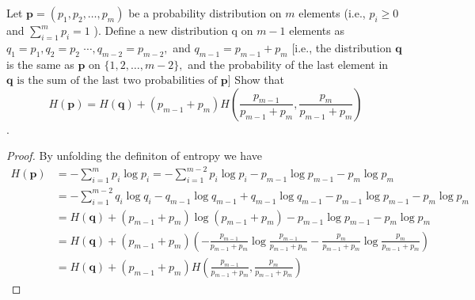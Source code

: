 \begin{exercise}{Let $\mathbf{p}=\left(p_{1}, p_{2}, \ldots, p_{m}\right)$ be a probability distribution on $m$ elements (i.e., $p_{i} \geq 0$ and $\sum_{i=1}^{m} p_{i}=1$ ). Define a new distribution q on $m-1$ elements as $q_{1}=p_{1}, q_{2}=p_{2}$ $\cdots, q_{m-2}=p_{m-2},$ and $q_{m-1}=p_{m-1}+p_{m}$ [i.e., the distribution $\mathbf{q}$ is the same as $\mathbf{p}$ on $\{1,2, \ldots, m-2\},$ and the probability of the last element in $\mathbf{q} \text { is the sum of the last two probabilities of } \mathbf{p}]$ Show that
\begin{equation}H(\mathbf{p})=H(\mathbf{q})+\left(p_{m-1}+p_{m}\right) H\left(\frac{p_{m-1}}{p_{m-1}+p_{m}}, \frac{p_{m}}{p_{m-1}+p_{m}}\right)\end{equation}
  }.
  \begin{proof}
    By unfolding the definiton of entropy we have
    \begin{equation}\begin{aligned}
      H(\mathbf{p}) &=-\sum_{i=1}^{m} p_{i} \log p_{i} =-\sum_{i=1}^{m-2} p_{i}\log p_{i}-p_{m-1} \log p_{m-1}-p_{m} \log p_{m} \\
      &=-\sum_{i=1}^{m-2} q_{i} \log q_{i}-q_{m-1} \log q_{m-1}+ q_{m-1} \log q_{m-1} -p_{m-1} \log p_{m-1}-p_{m} \log p_{m} \\
      &= H(\mathbf{q}) + (p_{m-1}+p_{m}) \log (p_{m-1}+p_{m}) -p_{m-1} \log p_{m-1}-p_{m} \log p_{m} \\
      &= H(\mathbf{q})+\left(p_{m-1}+p_{m}\right)\left(- \frac{p_{m-1}}{p_{m-1}+p_{m}} \log \frac{p_{m-1}}{p_{m-1}+p_{m}} - \frac{p_{m}}{p_{m-1}+p_{m}} \log \frac{p_{m}}{p_{m-1}+p_{m}} \right) \\
      &=H(\mathbf{q})+\left(p_{m-1}+p_{m}\right) H\left(\frac{p_{m-1}}{p_{m-1}+p_{m}}, \frac{p_{m}}{p_{m-1}+p_{m}}\right)
      \end{aligned}\end{equation}
  \end{proof}
  \label{ex2}
\end{exercise}

